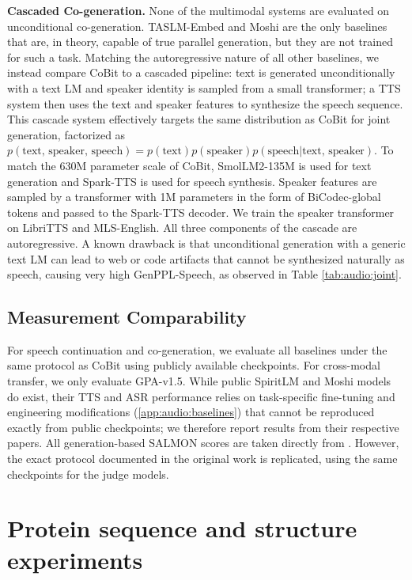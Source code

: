 \textbf{Cascaded Co-generation.} None of the multimodal systems are evaluated on unconditional co-generation. TASLM-Embed and Moshi are the only baselines that are, in theory, capable of true parallel generation, but they are not trained for such a task. Matching the autoregressive nature of all other baselines, we instead compare CoBit to a cascaded pipeline: text is generated unconditionally with a text LM and speaker identity is sampled from a small transformer; a TTS system then uses the text and speaker features to synthesize the speech sequence. This cascade system effectively targets the same distribution as CoBit for joint generation, factorized as $p(\text{text, speaker, speech}) = p(\text{text})p(\text{speaker})p(\text{speech}|\text{text, speaker})$. To match the $630$M parameter scale of CoBit, SmolLM2-135M \citep{audio:smollm} is used for text generation and Spark-TTS \citep{audio:spark-tts} is used for speech synthesis. Speaker features are sampled by a transformer with 1M parameters in the form of BiCodec-global tokens and passed to the Spark-TTS decoder. We train the speaker transformer on LibriTTS and MLS-English. All three components of the cascade are autoregressive. A known drawback is that unconditional generation with a generic text LM can lead to web or code artifacts that cannot be synthesized naturally as speech, causing very high GenPPL-Speech, as observed in Table \ref{tab:audio:joint}.

\subsection{Measurement Comparability} \label{app:audio:comparability}

For speech continuation and co-generation, we evaluate all baselines under the same protocol as CoBit using publicly available checkpoints. For cross-modal transfer, we only evaluate GPA-v1.5. While public SpiritLM and Moshi models do exist, their TTS and ASR performance relies on task-specific fine-tuning and engineering modifications (\ref{app:audio:baselines}) that cannot be reproduced exactly from public checkpoints; we therefore report results from their respective papers. All generation-based SALMON scores are taken directly from \cite{audio:gen-salmon}. However, the exact protocol documented in the original work is replicated, using the same checkpoints for the judge models.
 
\FloatBarrier
\section{Protein sequence and structure experiments}
\label{app:protein}


